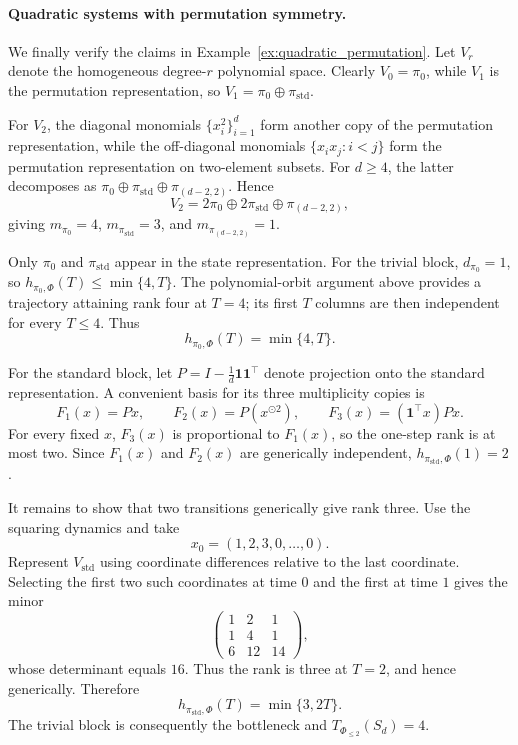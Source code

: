 \documentclass[11pt]{article}
\theoremstyle{plain}
\theoremstyle{definition}
\theoremstyle{remark}
\begin{document}
\paragraph{Quadratic systems with permutation symmetry.}
We finally verify the claims in
Example~\ref{ex:quadratic_permutation}. Let \(V_r\) denote the homogeneous
degree-\(r\) polynomial space. Clearly \(V_0=\pi_0\), while \(V_1\) is the
permutation representation, so
\(V_1=\pi_0\oplus\pi_{\mathrm{std}}\).

For \(V_2\), the diagonal monomials
\(\{x_i^2\}_{i=1}^d\) form another copy of the permutation representation,
while the off-diagonal monomials
\(\{x_ix_j:i<j\}\) form the permutation representation on two-element
subsets. For \(d\ge4\), the latter decomposes as
\(\pi_0\oplus\pi_{\mathrm{std}}\oplus\pi_{(d-2,2)}\). Hence
\[
V_2
=
2\pi_0\oplus2\pi_{\mathrm{std}}
\oplus\pi_{(d-2,2)},
\]
giving \(m_{\pi_0}=4\), \(m_{\pi_{\mathrm{std}}}=3\), and
\(m_{\pi_{(d-2,2)}}=1\).

Only \(\pi_0\) and \(\pi_{\mathrm{std}}\) appear in the state representation.
For the trivial block, \(d_{\pi_0}=1\), so
\(h_{\pi_0,\Phi}(T)\le\min\{4,T\}\). The polynomial-orbit argument above
provides a trajectory attaining rank four at \(T=4\); its first \(T\)
columns are then independent for every \(T\le4\). Thus
\[
h_{\pi_0,\Phi}(T)=\min\{4,T\}.
\]

For the standard block, let
\(P=I-\frac1d\mathbf 1\mathbf 1^\top\) denote projection onto the standard
representation. A convenient basis for its three multiplicity copies is
\[
F_1(x)=Px,\qquad
F_2(x)=P(x^{\odot2}),\qquad
F_3(x)=(\mathbf 1^\top x)Px.
\]
For every fixed \(x\), \(F_3(x)\) is proportional to \(F_1(x)\), so the
one-step rank is at most two. Since \(F_1(x)\) and \(F_2(x)\) are generically
independent, \(h_{\pi_{\mathrm{std}},\Phi}(1)=2\).

It remains to show that two transitions generically give rank three. Use the
squaring dynamics and take
\[
x_0=(1,2,3,0,\ldots,0).
\]
Represent \(V_{\mathrm{std}}\) using coordinate differences relative to the
last coordinate. Selecting the first two such coordinates at time \(0\) and
the first at time \(1\) gives the minor
\[
\begin{pmatrix}
1&2&1\\
1&4&1\\
6&12&14
\end{pmatrix},
\]
whose determinant equals \(16\). Thus the rank is three at \(T=2\), and hence
generically. Therefore
\[
h_{\pi_{\mathrm{std}},\Phi}(T)=\min\{3,2T\}.
\]
The trivial block is consequently the bottleneck and
\(T_{\Phi_{\le2}}(S_d)=4\).
\end{document}
